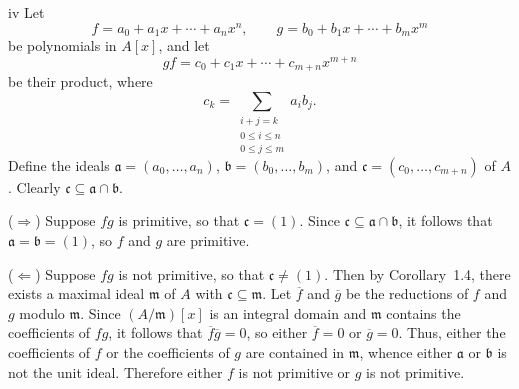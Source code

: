 \begin{partsolution}{1}{2}{iv}
Let
\begin{equation*}
f = a_0 + a_1 x + \cdots + a_n x^n,
\qquad
g = b_0 + b_1 x + \cdots + b_m x^m
\end{equation*}
be polynomials in \(A[x]\), and let
\begin{equation*}
g f = c_0 + c_1 x + \cdots + c_{m+n} x^{m+n}
\end{equation*}
be their product, where
\begin{equation*}
c_k = \sum_{\substack{i+j=k \\ 0\leq i\leq n\\0\leq j\leq m}} a_i b_j.
\end{equation*}
Define the ideals \(\mathfrak a = (a_0,\ldots,a_n)\), \(\mathfrak b = (b_0,\ldots,b_m)\), and \(\mathfrak c = (c_0,\ldots,c_{m+n})\) of \(A\).
Clearly \(\mathfrak c \subseteq \mathfrak a \cap \mathfrak b\).

(\(\Rightarrow\))
Suppose \(f g\) is primitive, so that \(\mathfrak c = (1)\).
Since \(\mathfrak c \subseteq \mathfrak a \cap \mathfrak b\), it follows that \(\mathfrak a = \mathfrak b = (1)\), so \(f\) and \(g\) are primitive.

(\(\Leftarrow\))
Suppose \(f g\) is not primitive, so that \(\mathfrak c \neq (1)\).
Then by Corollary~1.4, there exists a maximal ideal \(\mathfrak m\) of \(A\) with \(\mathfrak c \subseteq \mathfrak m\).
Let \(\overline f\) and \(\overline g\) be the reductions of \(f\) and \(g\) modulo \(\mathfrak m\).
Since \((A/\mathfrak m)[x]\) is an integral domain and \(\mathfrak m\) contains the coefficients of \(f g\), it follows that \(\overline f \overline g = 0\), so either \(\overline f = 0\) or \(\overline g = 0\).
Thus, either the coefficients of \(f\) or the coefficients of \(g\) are contained in \(\mathfrak m\), whence either \(\mathfrak a\) or \(\mathfrak b\) is not the unit ideal.
Therefore either \(f\) is not primitive or \(g\) is not primitive.
\end{partsolution}